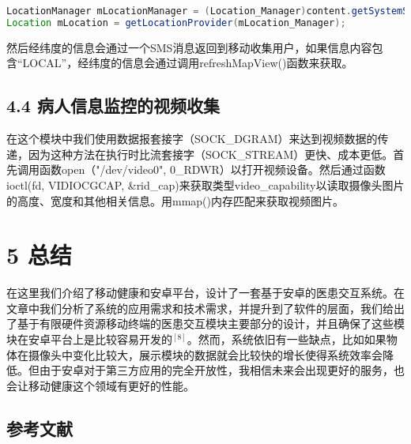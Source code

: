\begin{lstlisting}[language=Java]
LocationManager mLocationManager = (Location_Manager)content.getSystemService(Context.LOCATION_SERVICE);
Location mLocation = getLocationProvider(mLocation_Manager);
\end{lstlisting}

然后经纬度的信息会通过一个SMS消息返回到移动收集用户，如果信息内容包含“LOCAL”，经纬度的信息会通过调用refreshMapView()函数来获取。

\subsection*{4.4 病人信息监控的视频收集}

在这个模块中我们使用数据报套接字（SOCK\_DGRAM）来达到视频数据的传递，因为这种方法在执行时比流套接字（SOCK\_STREAM）更快、成本更低。首先调用函数open（"/dev/video0", 0\_RDWR）以打开视频设备。然后通过函数ioctl(fd, VIDIOCGCAP, \&rid\_cap)来获取类型video\_capability以读取摄像头图片的高度、宽度和其他相关信息。用mmap()内存匹配来获取视频图片。

\section*{5 总结}

在这里我们介绍了移动健康和安卓平台，设计了一套基于安卓的医患交互系统。在文章中我们分析了系统的应用需求和技术需求，并提升到了软件的层面，我们给出了基于有限硬件资源移动终端的医患交互模块主要部分的设计，并且确保了这些模块在安卓平台上是比较容易开发的$^{[8]}$。然而，系统依旧有一些缺点，比如如果物体在摄像头中变化比较大，展示模块的数据就会比较快的增长使得系统效率会降低。但由于安卓对于第三方应用的完全开放性，我相信未来会出现更好的服务，也会让移动健康这个领域有更好的性能。

\begin{center}
\section*{参考文献}
\end{center}

